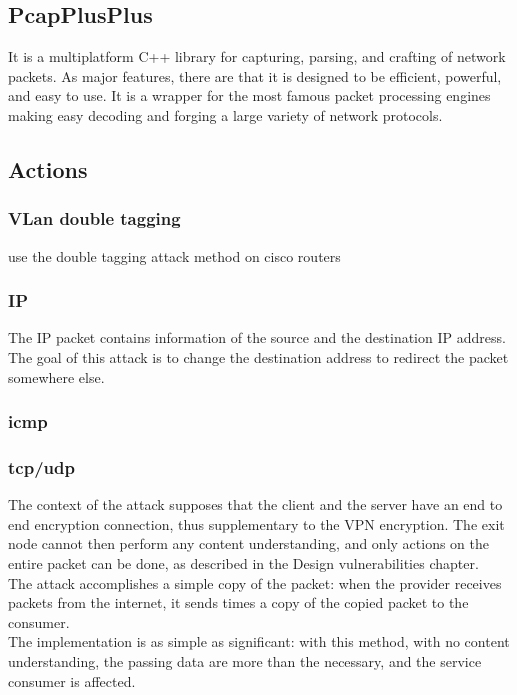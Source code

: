\documentclass[12pt]{article}
\begin{document}
	\subsection{PcapPlusPlus}
	It is a multiplatform C++ library for capturing, parsing, and crafting of network packets. As major features, there are that it is designed to be efficient, powerful, and easy to use. It is a wrapper for the most famous packet processing engines making easy decoding and forging a large variety of network protocols.
 
	\subsection{Actions}
	\subsubsection{VLan double tagging}
	use the double tagging attack method on cisco routers


	\subsubsection{IP}
	The IP packet contains information of the source and the destination IP address. The goal of this attack is to change the destination address to redirect the packet somewhere else.\\
	

	\subsubsection{icmp}

	\subsubsection{tcp/udp}
	
	The context of the attack supposes that the client and the server have an end to end encryption connection, thus supplementary to the VPN encryption. The exit node cannot then perform any content understanding, and only actions on the entire packet can be done, as described in the Design vulnerabilities chapter.\\
	The attack accomplishes a simple copy of the packet: when the provider receives packets from the internet, it sends  times a copy of the copied packet to the consumer.\\
	The implementation is as simple as significant: with this method, with no content understanding, the passing data are more than the necessary, and the service consumer is affected.
\end{document}
